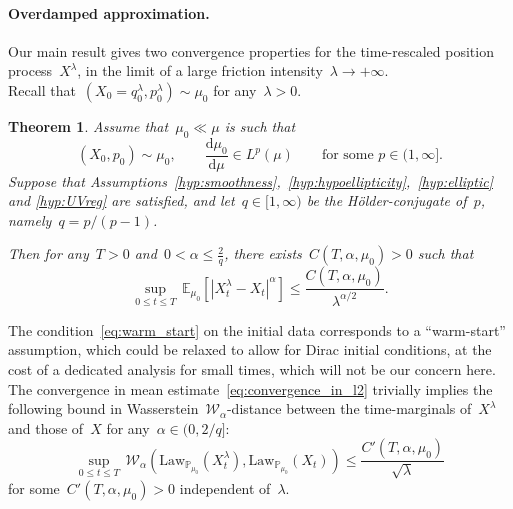 \documentclass[10pt]{article}
\renewcommand{\d}{\mathrm{d}}
\newcommand{\E}{\mathbb{E}}
\renewcommand{\P}{\mathbb{P}}
\newcommand{\1}{\mathbbm 1}
\newcommand{\cW}{\mathcal{W}}
\newtheorem{theorem}{Theorem}
\begin{document}
\paragraph{Overdamped approximation.}
Our main result gives two convergence properties for the time-rescaled position process~$X^\lambda$, in the limit of a large friction intensity~$\lambda\to +\infty$.\\
Recall that~${(X_0=q_0^\lambda,p_0^\lambda)\sim \mu_0}$ for any~$\lambda>0$.
\begin{theorem}
\label{thm:overdamped_limit}
Assume that~$\mu_0\ll \mu$ is such that
\begin{equation}
\label{eq:warm_start}
(X_0,p_0)\sim \mu_0,\qquad \frac{\d\mu_0}{\d\mu}\in L^p(\mu)\qquad\text{for some }p\in(1,\infty].
\end{equation}
Suppose that Assumptions~\ref{hyp:smoothness},~\ref{hyp:hypoellipticity},~\ref{hyp:elliptic} and \ref{hyp:UVreg} are satisfied, and let~$q\in[1,\infty)$ be the H\"older-conjugate of~$p$, namely~$q = p/(p-1)$.

Then for any~$T>0$ and~$0<\alpha\leq\frac{2}{q}$, there exists~$C(T,\alpha,\mu_0)>0$ such that    
    \begin{equation}
    \label{eq:convergence_in_l2}
    \underset{0\leq t\leq T}{\sup}\,\E_{\mu_0}\left[|X_t^\lambda-X_t|^\alpha\right]\leq \frac{C(T,\alpha,\mu_0)}{\lambda^{\alpha/2}}.
    \end{equation}
\end{theorem}
The condition~\eqref{eq:warm_start} on the initial data corresponds to a ``warm-start'' assumption, which could be relaxed to allow for Dirac initial conditions, at the cost of a dedicated analysis for small times, which will not be our concern here.
The convergence in mean estimate~\eqref{eq:convergence_in_l2} trivially implies the following bound in Wasserstein~$\cW_\alpha$-distance between the time-marginals of~$X^\lambda$ and those of~$X$ for any~${\alpha\in (0,2/q]}$:
\begin{equation}
    \label{eq:wasserstein_bound}
    \underset{0\leq t\leq T}{\sup}\, \cW_\alpha\left(\mathrm{Law}_{\P_{\mu_0}}(X_t^\lambda),\mathrm{Law}_{\P_{\mu_0}}(X_t)\right)\leq \frac{C'(T,\alpha,\mu_0)}{\sqrt{\lambda}}
\end{equation}
for some~$C'(T,\alpha,\mu_0)>0$ independent of~$\lambda$.
\end{document}
